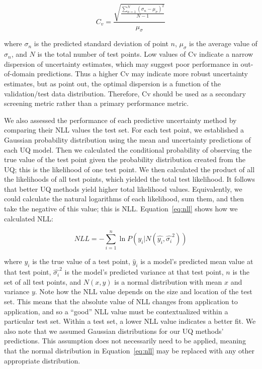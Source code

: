 \documentclass[]{achemso}
\begin{document}
\begin{equation}\label{eq:dispersion}
    C_v = \frac{\sqrt{\frac{\sum_{n=1}^{N}(\sigma_n-\mu_{\sigma})^2}{N-1}}}{\mu_{\sigma}}  %
\end{equation}

\noindent where $\sigma_n$ is the predicted standard deviation of point $n$, $\mu_{\sigma}$ is the average value of $\sigma_n$, and $N$ is the total number of test points.
Low values of \gls{Cv} indicate a narrow dispersion of uncertainty estimates, which may suggest poor performance in out-of-domain predictions.
Thus a higher \gls{Cv} may indicate more robust uncertainty estimates, but as \citet{Scalia2019} point out, the optimal dispersion is a function of the validation/test data distribution.
Therefore, \gls{Cv} should be used as a secondary screening metric rather than a primary performance metric.

We also assessed the performance of each predictive uncertainty method by comparing their \gls{NLL} values the test set.
For each test point, we established a Gaussian probability distribution using the mean and uncertainty predictions of each \gls{UQ} model.
Then we calculated the conditional probability of observing the true value of the test point given the probability distribution created from the \gls{UQ}; this is the likelihood of one test point.
We then calculated the product of all the likelihoods of all test points, which yielded the total test likelihood.
It follows that better \gls{UQ} methods yield higher total likelihood values.
Equivalently, we could calculate the natural logarithms of each likelihood, sum them, and then take the negative of this value; this is \gls{NLL}.
Equation~\ref{eq:nll} shows how we calculated \gls{NLL}:

\begin{equation}\label{eq:nll}
    NLL = - \sum_{i=1}^{n} \ln{P(y_i | N(\hat{y_i}, \hat{\sigma_i}^2))}
\end{equation}

\noindent where $y_i$ is the true value of a test point, $\hat{y}_i$ is a model's predicted mean value at that test point, $\hat{\sigma_i}^2$ is the model's predicted variance at that test point, $n$ is the set of all test points, and $N(x, y)$ is a normal distribution with mean $x$ and variance $y$.
Note how the \gls{NLL} value depends on the size and location of the test set.
This means that the absolute value of \gls{NLL} changes from application to application, and so a ``good'' \gls{NLL} value must be contextualized within a particular test set.
Within a test set, a lower \gls{NLL} value indicates a better fit.
We also note that we assumed Gaussian distributions for our \gls{UQ} methods' predictions.
This assumption does not necessarily need to be applied, meaning that the normal distribution in Equation~\ref{eq:nll} may be replaced with any other appropriate distribution.
\end{document}
